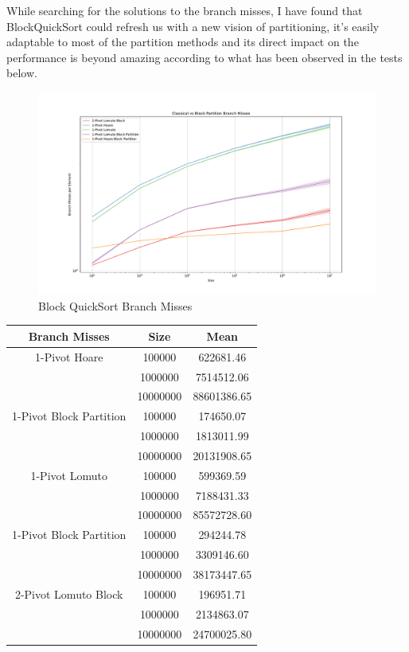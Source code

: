 \documentclass{article}
\begin{document}
While searching for the solutions to the branch misses, I have found that BlockQuickSort could refresh us with a new vision of partitioning, it's easily adaptable to most of the partition methods and its direct impact on the performance is beyond amazing
according to what has been observed in the tests below.

\begin{figure}[H]
    \hypertarget{fig:blockbranchmiss}{}
    \caption{Block QuickSort Branch Misses}
    \centering
    \hspace*{-0.27\textwidth}
    \includegraphics[width=1.5\textwidth]{Classical vs Block Partition Branch Misses.pdf}
\end{figure}

\begin{center}
\small
\begin{tabular}{ |c c | c | }
    \hline
    Branch Misses   & Size     & Mean         \\
    \hline
    1-Pivot Hoare   & 100000   & 622681.46    \\
                    & 1000000  & 7514512.06   \\
                    & 10000000 & 88601386.65  \\
    \hline
1-Pivot Block Partition & 100000   & 174650.07    \\
                    & 1000000  & 1813011.99   \\
                    & 10000000 & 20131908.65  \\
    \hline
    1-Pivot Lomuto  & 100000   & 599369.59    \\
                    & 1000000  & 7188431.33   \\
                    & 10000000 & 85572728.60  \\
    \hline
1-Pivot Block Partition & 100000   & 294244.78    \\
                    & 1000000  & 3309146.60   \\
                    & 10000000 & 38173447.65  \\
    \hline
2-Pivot Lomuto Block& 100000   & 196951.71    \\
                    & 1000000  & 2134863.07   \\
                    & 10000000 & 24700025.80  \\
    \hline
\end{tabular}
\end{center}
\end{document}
